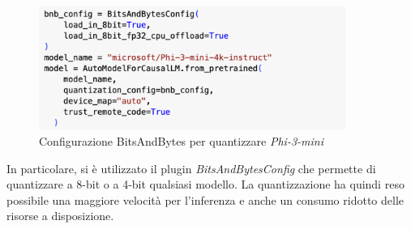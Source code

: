     \begin{figure}[htp]
    \centering
    \includegraphics[width=10cm]{img/bitsAndBytes.pdf}
    \caption{Configurazione BitsAndBytes per quantizzare \textit{Phi-3-mini}}
    \end{figure}
    In particolare, si è utilizzato il plugin \textit{BitsAndBytesConfig} che permette di quantizzare a 8-bit o a 4-bit qualsiasi modello.
    La quantizzazione ha quindi reso possibile una maggiore velocità per l'inferenza e anche un consumo ridotto delle risorse a disposizione.

